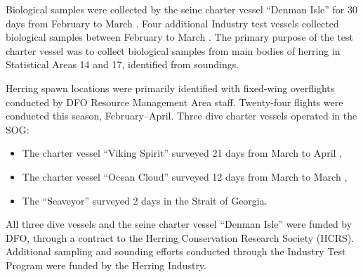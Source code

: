 Biological samples were collected by the seine charter vessel ``Denman Isle'' for 30 days from February  to March .
Four additional Industry test vessels collected biological samples between February  to March .
The primary purpose of the test charter vessel was to collect biological samples from main bodies of herring in Statistical Areas 14 and 17, identified from soundings.

Herring spawn locations were primarily identified with fixed-wing overflights conducted by DFO Resource Management Area staff.
Twenty-four flights were conducted this season, February--April. 
Three dive charter vessels operated in the SOG:
\begin{itemize}
\item The charter vessel ``Viking Spirit'' surveyed 21 days from March  to April ,
\item The charter vessel ``Ocean Cloud'' surveyed 12 days from March  to March ,
\item The ``Seaveyor'' surveyed 2 days in the Strait of Georgia.
\end{itemize}

All three dive vessels and the seine charter vessel ``Denman Isle'' were funded by DFO, through a contract to the Herring Conservation Research Society (HCRS).
Additional sampling and sounding efforts conducted through the Industry Test Program were funded by the Herring Industry.
